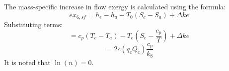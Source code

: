The mass-specific increase in flow exergy is calculated using the formula:  
\[
ex_{6,sf} = h_e - h_a - T_0(S_e - S_a) + \Delta ke
\]
Substituting terms:  
\[
= c_p (T_e - T_a) - T_e \left( S_e - \frac{c_p}{T} \right) + \Delta ke
\]
\[
= 2c (q_c Q_c) \frac{c_p}{k_8}
\]
It is noted that \( \ln(n) = 0 \).